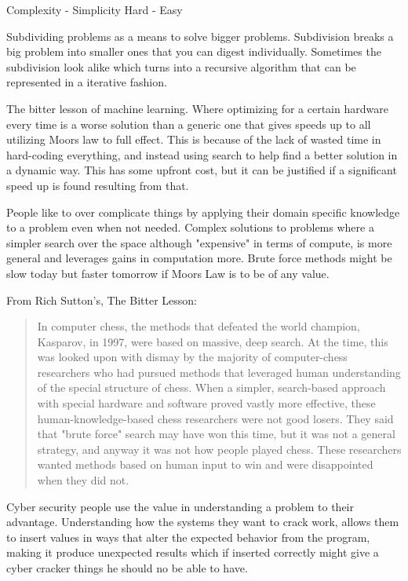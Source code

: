 \documentclass[a4paper]{article}
\begin{document}
Complexity - Simplicity 
Hard - Easy 

Subdividing problems as a means to solve bigger problems. Subdivision breaks a big problem into smaller ones that you can digest individually. Sometimes the subdivision look alike which turns into a recursive algorithm that can be represented in a iterative fashion. 

The bitter lesson of machine learning. Where optimizing for a certain hardware every time is a worse solution than a generic one that gives speeds up to all utilizing Moors law to full effect. This is because of the lack of wasted time in hard-coding everything, and instead using search to help find a better solution in a dynamic way. This has some upfront cost, but it can be justified if a significant speed up is found resulting from that. 

People like to over complicate things by applying their domain specific knowledge to a problem 
even when not needed. 
Complex solutions to problems where a simpler search over the space 
although "expensive" in terms of compute, is more general and leverages gains in computation 
more. Brute force methods might be slow today but faster tomorrow if Moors Law is to be of 
any value.

From Rich Sutton's, The Bitter Lesson:
\begin{quotation}
In computer chess, the methods that defeated the world champion, Kasparov, in 1997, were based on massive, deep search. At the time, this was looked upon with dismay by the majority of computer-chess researchers who had pursued methods that leveraged human understanding of the special structure of chess. When a simpler, search-based approach with special hardware and software proved vastly more effective, these human-knowledge-based chess researchers were not good losers. They said that "brute force" search may have won this time, but it was not a general strategy, and anyway it was not how people played chess. These researchers wanted methods based on human input to win and were disappointed when they did not.
\end{quotation}


Cyber security people use the value in understanding a problem to their advantage. Understanding how the systems they want to crack work, allows them to insert values in ways that alter the expected behavior from the program, making it produce unexpected results which if inserted correctly might give a cyber cracker things he should no be able to have.  
\end{document}
